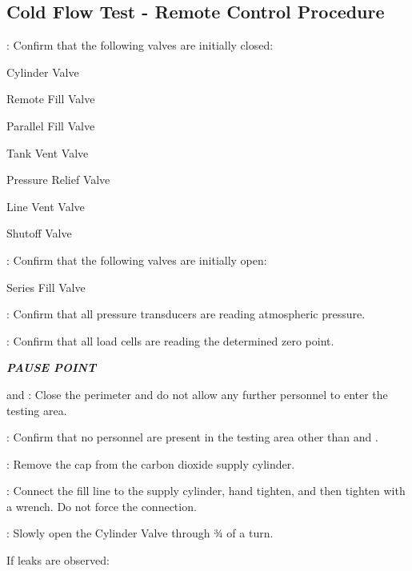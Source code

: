 \subsection{Cold Flow Test - Remote Control Procedure}
\begin{checklist}
    \item \primary{}: Confirm that the following valves are initially closed:
    \begin{checklist}
        \item Cylinder Valve
        \item Remote Fill Valve
        \item Parallel Fill Valve
        \item Tank Vent Valve
        \item Pressure Relief Valve
        \item Line Vent Valve
        \item Shutoff Valve
    \end{checklist}
    \item \primary{}: Confirm that the following valves are initially open:
    \begin{checklist}
        \item Series Fill Valve
    \end{checklist}
    \item \daq{}: Confirm that all pressure transducers are reading atmospheric pressure.
    \item \daq{}: Confirm that all load cells are reading the determined zero point.
    \item \textbf{\textit{PAUSE POINT}}
    \item \peri{} and \perii{}: Close the perimeter and do not allow any further personnel to enter the testing area.
    \item \secondary: Confirm that no personnel are present in the testing area other than \primary{} and \secondary.
    \item \primary{}: Remove the cap from the carbon dioxide supply cylinder.
    \item \primary{}: Connect the fill line to the supply cylinder, hand tighten, and then tighten with a wrench. Do not force the connection.
    \item \primary{}: Slowly open the Cylinder Valve through ¾ of a turn.
    \begin{checklist}[label=$\bullet$]
        \item If leaks are observed:
        \begin{checklist}

\end{checklist}
\end{checklist}
\end{checklist}
